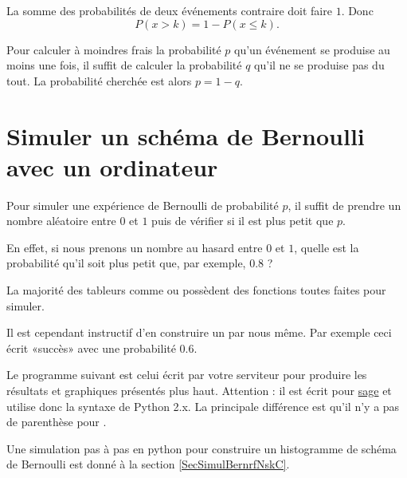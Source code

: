 \begin{Aretenir}
     La somme des probabilités de deux événements contraire doit faire \( 1\). Donc
    \begin{equation}
        P(x>k)=1-P(x\leq k).
    \end{equation}
\end{Aretenir}

\begin{example}
    Pour calculer à moindres frais la probabilité \( p\) qu'un événement se produise au moins une fois, il suffit de calculer la probabilité \( q\) qu'il ne se produise pas du tout. La probabilité cherchée est alors \( p=1-q\).
\end{example}

\section{Simuler un schéma de Bernoulli avec un ordinateur}

Pour simuler une expérience de Bernoulli de probabilité \( p\), il suffit de prendre un nombre aléatoire entre \( 0\) et \( 1\) puis de vérifier si il est plus petit que \( p\).

En effet, si nous prenons un nombre au hasard entre \( 0\) et \( 1\), quelle est la probabilité qu'il soit plus petit que, par exemple, \( 0.8\) ?

La majorité des tableurs comme  ou  possèdent des fonctions toutes faites pour simuler.

Il est cependant instructif d'en construire un par nous même. Par exemple ceci écrit «succès» avec une probabilité \( 0.6\).


Le programme suivant est celui écrit par votre serviteur pour produire les résultats et graphiques présentés plus haut. Attention : il est écrit pour \href{http://sagemath.org}{sage} et utilise donc la syntaxe de Python 2.x. La principale différence est qu'il n'y a pas de parenthèse pour .


Une simulation pas à pas en python pour construire un histogramme de schéma de Bernoulli est donné à la section \ref{SecSimulBernrfNskC}.

